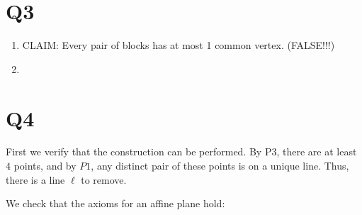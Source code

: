 \documentclass[a4paper, 11pt]{article}
\begin{document}
\pagebreak
\section*{Q3}
\begin{enumerate}[label=(\alph*)]
	\item CLAIM: Every pair of blocks has at most 1 common vertex. (FALSE!!!)



	\item 
\end{enumerate}

\section*{Q4}
First we verify that the construction can be performed. By P3, there are at least $4$ points, and by $P1$, any distinct pair of these points is on a unique line. Thus, there is a line $\ell$ to remove. 

We check that the axioms for an affine plane hold: 
\end{document}

